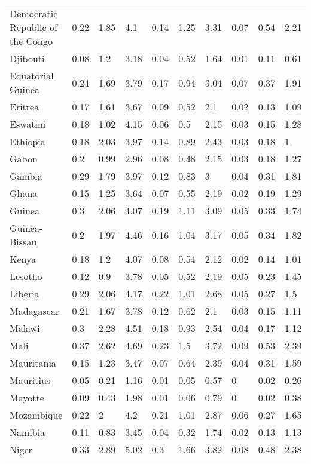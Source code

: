 \begin{longtable}[t]{llllllllll}
Democratic Republic of the Congo & 0.22 & 1.85 & 4.1 & 0.14 & 1.25 & 3.31 & 0.07 & 0.54 & 2.21\\
Djibouti & 0.08 & 1.2 & 3.18 & 0.04 & 0.52 & 1.64 & 0.01 & 0.11 & 0.61\\
Equatorial Guinea & 0.24 & 1.69 & 3.79 & 0.17 & 0.94 & 3.04 & 0.07 & 0.37 & 1.91\\
Eritrea & 0.17 & 1.61 & 3.67 & 0.09 & 0.52 & 2.1 & 0.02 & 0.13 & 1.09\\
Eswatini & 0.18 & 1.02 & 4.15 & 0.06 & 0.5 & 2.15 & 0.03 & 0.15 & 1.28\\
Ethiopia & 0.18 & 2.03 & 3.97 & 0.14 & 0.89 & 2.43 & 0.03 & 0.18 & 1\\
Gabon & 0.2 & 0.99 & 2.96 & 0.08 & 0.48 & 2.15 & 0.03 & 0.18 & 1.27\\
Gambia & 0.29 & 1.79 & 3.97 & 0.12 & 0.83 & 3 & 0.04 & 0.31 & 1.81\\
Ghana & 0.15 & 1.25 & 3.64 & 0.07 & 0.55 & 2.19 & 0.02 & 0.19 & 1.29\\
Guinea & 0.3 & 2.06 & 4.07 & 0.19 & 1.11 & 3.09 & 0.05 & 0.33 & 1.74\\
Guinea-Bissau & 0.2 & 1.97 & 4.46 & 0.16 & 1.04 & 3.17 & 0.05 & 0.34 & 1.82\\
Kenya & 0.18 & 1.2 & 4.07 & 0.08 & 0.54 & 2.12 & 0.02 & 0.14 & 1.01\\
Lesotho & 0.12 & 0.9 & 3.78 & 0.05 & 0.52 & 2.19 & 0.05 & 0.23 & 1.45\\
Liberia & 0.29 & 2.06 & 4.17 & 0.22 & 1.01 & 2.68 & 0.05 & 0.27 & 1.5\\
Madagascar & 0.21 & 1.67 & 3.78 & 0.12 & 0.62 & 2.1 & 0.03 & 0.15 & 1.11\\
Malawi & 0.3 & 2.28 & 4.51 & 0.18 & 0.93 & 2.54 & 0.04 & 0.17 & 1.12\\
Mali & 0.37 & 2.62 & 4.69 & 0.23 & 1.5 & 3.72 & 0.09 & 0.53 & 2.39\\
Mauritania & 0.15 & 1.23 & 3.47 & 0.07 & 0.64 & 2.39 & 0.04 & 0.31 & 1.59\\
Mauritius & 0.05 & 0.21 & 1.16 & 0.01 & 0.05 & 0.57 & 0 & 0.02 & 0.26\\
Mayotte & 0.09 & 0.43 & 1.98 & 0.01 & 0.06 & 0.79 & 0 & 0.02 & 0.38\\
Mozambique & 0.22 & 2 & 4.2 & 0.21 & 1.01 & 2.87 & 0.06 & 0.27 & 1.65\\
Namibia & 0.11 & 0.83 & 3.45 & 0.04 & 0.32 & 1.74 & 0.02 & 0.13 & 1.13\\
Niger & 0.33 & 2.89 & 5.02 & 0.3 & 1.66 & 3.82 & 0.08 & 0.48 & 2.38\\

\end{longtable}
